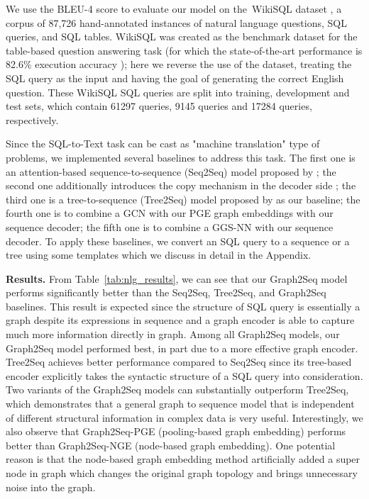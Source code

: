 \documentclass{article} \usepackage{iclr2019_conference,times}
\begin{document}
We use the BLEU-4 score to evaluate our model on the~WikiSQL dataset \citep{zhongSeq2SQL2017}, a corpus of 87,726 hand-annotated instances of natural language questions, SQL queries, and SQL tables. 
WikiSQL was created as the benchmark dataset for the table-based question answering task (for which the state-of-the-art performance is 82.6\% execution accuracy \citep{yu2018typesql}); here we reverse the use of the dataset, treating the SQL query as the input and having the goal of generating the correct English question. 
These WikiSQL SQL queries are split into training, development and test sets, which contain 61297 queries, 9145 queries and 17284 queries, respectively.

Since the SQL-to-Text task can be cast as "machine translation" type of problems, we implemented several baselines to address this task. The first one is an attention-based sequence-to-sequence (Seq2Seq) model proposed by \citep{bahdanau2014neural}; 
the second one additionally introduces the copy mechanism in the decoder side \citep{gu2016incorporating};
the third one is a tree-to-sequence (Tree2Seq) model proposed by \citep{eriguchi2016tree} as our baseline;
the fourth one is to combine a GCN \citep{kipf2016semi} with our PGE graph embeddings with our sequence decoder;
the fifth one is to combine a GGS-NN \citep{li2015gated} with our sequence decoder. 
To apply these baselines, we convert an SQL query to a sequence or a tree using some templates which we discuss in detail in the Appendix.

\textbf{Results.} From Table~\ref{tab:nlg_results}, we can see that our Graph2Seq model performs significantly better than the Seq2Seq, Tree2Seq, and Graph2Seq baselines.
This result is expected since the structure of SQL query is essentially a graph despite its expressions in sequence and a graph encoder is able to capture much more information directly in graph. Among all Graph2Seq models, our Graph2Seq model performed best, in part due to a more effective graph encoder. 
Tree2Seq achieves better performance compared to Seq2Seq since its tree-based encoder explicitly takes the syntactic structure of a SQL query into consideration. 
 Two variants of the Graph2Seq models can substantially outperform Tree2Seq, which demonstrates that a general graph to sequence model that is independent of different structural information in complex data is very useful.
 Interestingly, we also observe that Graph2Seq-PGE (pooling-based graph embedding) performs better than Graph2Seq-NGE (node-based graph embedding). One potential reason is that the node-based graph embedding method artificially added a super node in graph which changes the original graph topology and brings unnecessary noise into the graph. 
\end{document}
